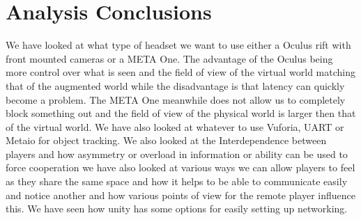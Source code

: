 \section{Analysis Conclusions} \label{sec:analysisconclusion}
We have looked at what type of headset we want to use either a Oculus rift with front mounted cameras or a META One. The advantage of the Oculus being more control over what is seen and the field of view of the virtual world matching that of the augmented world while the disadvantage is that latency can quickly become a problem. The META One meanwhile does not allow us to completely block something out and the field of view of the physical world is larger then that of the virtual world. We have also looked at whatever to use Vuforia, UART or Metaio for object tracking. 
We also looked at the Interdependence between players and how asymmetry or overload in information or ability can be used to force cooperation we have also looked at various ways we can allow players to feel as they share the same space and how it helps to be able to communicate easily and notice another and how various points of view for the remote player influence this. We have seen how unity has some options for easily setting up networking. 


	

